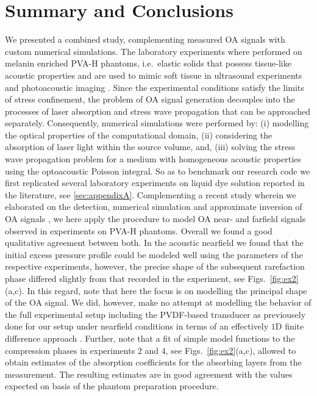 \documentclass[12pt]{iopart}
\begin{document}

\section{Summary and Conclusions}
\label{sec:summary}

We presented a combined study, complementing measured OA signals with custom
numerical simulations. The laboratory experiments where performed on melanin
enriched PVA-H phantoms, i.e.\ elastic solids that possess tissue-like acoustic
properties and are used to mimic soft tissue in ultrasound experiments and
photoacoustic imaging \cite{Zell:2007,Xia:2011}.  Since the experimental
conditions satisfy the limits of stress confinement, the problem of OA signal
generation decouples into the processes of laser absorption and stress wave
propagation that can be approached separately.  Consequently, numerical simulations
were performed by: (i) modelling the optical properties of the computational
domain, (ii) considering the absorption of laser light within the source
volume, and, (iii) solving the stress wave propagation problem for a medium
with homogeneous acoustic properties using the optoacoustic Poisson integral.
So as to benchmark our research code we first replicated several laboratory
experiments on liquid dye solution reported in the literature, see
\ref{sec:appendixA}.
Complementing a recent study wherein we elaborated on the detection, numerical
simulation and approximate inversion of OA signals \cite{Blumenroether:2016},
we here apply the procedure to model OA near- and farfield signals observed in
experiments on PVA-H phantoms. Overall we found a good qualitative agreement
between both. In the acoustic nearfield we found that the initial excess
pressure profile could be modeled well using the parameters of the respective
experiments, however, the precise shape of the subsequent rarefaction phase
differed slightly from that recorded in the experiment, see Figs.\
\ref{fig:ex2}(a,c).  In this regard, note that here the focus is on modelling
the principal shape of the OA signal.
We did, however, make no attempt at modelling the behavior of the full
experimental setup including the  PVDF-based transducer as previousely done for
our setup under nearfield conditions in terms of an effectively $1$D finite
difference approach \cite{Melchert:2017}.
Further, note that a fit of simple model functions to the compression phases in
experiments 2 and 4, see Figs.\ \ref{fig:ex2}(a,c), allowed to obtain estimates
of the absorption coefficients for the absorbing layers from the measurement.
The resulting estimates are in good agreement with the values expected on basis
of the phantom preparation procedure.
\end{document}
